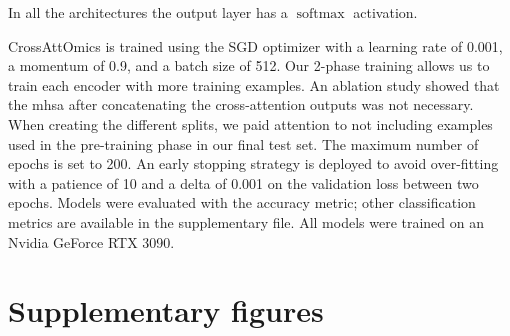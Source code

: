 	    In all the architectures the output layer has a \(\operatorname{softmax}\) activation.

	    CrossAttOmics is trained using the SGD optimizer with a learning rate of 0.001, a momentum of 0.9, and a batch size of 512.
	    Our 2-phase training allows us to train each encoder with more training examples.
	    An ablation study showed that the \gls{mhsa} after concatenating the cross-attention outputs was not necessary.
	    When creating the different splits, we paid attention to not including examples used in the pre-training phase in our final test set.
	    The maximum number of epochs is set to 200.
	    An early stopping strategy is deployed to avoid over-fitting with a patience of 10 and a delta of 0.001 on the validation loss between two epochs.
	    Models were evaluated with the accuracy metric; other classification metrics are available in the supplementary file.
	    All models were trained on an Nvidia GeForce RTX 3090.

	    \newpage
\section{Supplementary figures}

